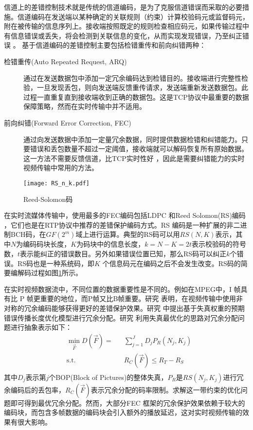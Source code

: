 信道上的差错控制技术就是传统的信道编码，是为了克服信道错误而采取的必要措施。信道编码在发送端以某种确定的关联规则（约束）计算校验码元或监督码元，附在被传输的信息序列上。接收端按照既定的规则检查相应码元，如果传输过程中有信息错误或丢失，将会检测到关联信息的变化，从而实现发现错误，乃至纠正错误 \cite{陈敏2004网络实时视频传输研究} \cite{wang1998error} \cite{wang2000error} 。
基于信道编码的差错控制主要包括检错重传和前向纠错两种：
\begin{description}
    \item[检错重传(Auto Repeated Request, ARQ) \cite{soltani2009delay}\cite{schier2012optimizing}] 通过在发送数据包中添加一定冗余编码达到检错目的。接收端进行完整性检验，一旦发现丢包，则向发送端反馈重传请求，发送端重新发送数据包。此过程一直重复直到接收端收到正确的数据包。这是TCP协议中最重要的数据保障策略，然而在实时传输中并不适用。
    \item[前向纠错(Forward Error Correction, FEC) \cite{nafaa2008forward}] 通过向发送数据中添加一定量冗余数据，同时提供数据检错和纠错能力。只要错误和丢包数量不超过一定阈值，接收端就可以解码恢复所有原始数据。这一方法不需要反馈信道，比TCP实时性好 \cite{davis1996joint}，因此是需要纠错能力的实时视频传输中常用的方法。
\end{description}

\begin{figure}[htbp]
  \centering
  \texttt{[image: RS\_n\_k.pdf]}
  \caption{Reed-Solomon码}
  \label{fig:RS_n_k}
\end{figure}

在实时流媒体传输中，使用最多的FEC编码包括LDPC \cite{richardson2003error}和Reed Solomon(RS)编码 \cite{wicker1999reed}，它们也是在RTP协议中推荐的差错保护编码方式。RS 编码是一种扩展的非二进制BCH码，在$GF(2^m)$域上进行运算。典型的RS码可以用$RS(N,K)$表示，其中$N$为编码码块长度，$K$为码块中的信息长度，$k=N-K=2t$表示校验码的符号数，$t$表示能纠正的错误数目。另外如果错误位置已知，那么RS码可以纠正$k$个错误。RS码也是一种系统码，即$K$ 个信息码元在编码之后不会发生改变。RS码的简要编解码过程如图\ref{fig:RS_n_k}所示。

在实时视频数据流中，不同位置的数据重要性是不同的。例如在MPEG中，I 帧具有比 P 帧更重要的地位，而P帧又比B帧重要。研究 \cite{yang2005unequal} \cite{zhang2011transmission} \cite{zhang2012novel} \cite{zhou2014novel}表明，在视频传输中使用非对称的冗余编码能够获得更好的差错保护效果。研究 \cite{yang2005unequal} 中提出基于失真权重的预期错误传播长度优化模型进行冗余分配。研究 \cite{zhang2011transmission} 利用失真最优化的思路对冗余分配问题进行抽象表示如下：
\begin{equation}
\begin{aligned}
& \underset{\vec F}{\min}D(\vec F) =
& &  \sum_{j=1}^J D_j P_R(N_j, K_j) \\
& \text{s.t.}
& & R_C(\vec F) \le R_T - R_S \\
\end{aligned}
\end{equation}
其中$D_j$表示第$j$个BOP(Block of Pictures)的整体失真，$P_R$是$RS(N_j, K_j)$进行冗余编码后的丢包率，$R_C(\vec F)$表示冗余分配的码率限制。求解这一带约束的优化问题即可得到最优冗余分配。然而，大部分FEC 框架的冗余保护效果依赖于较大的编码块，而包含多帧数据的编码块会引入额外的播放延迟，这对实时视频传输的效果有很大影响\cite{wang2000error}。

